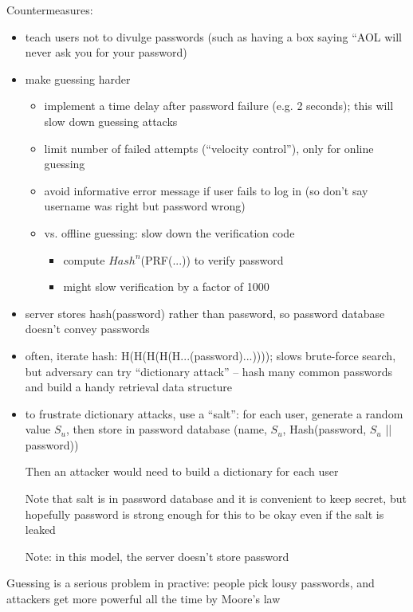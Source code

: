Countermeasures:
\begin{itemize}
    \item teach users not to divulge passwords (such as having a box saying
            ``AOL will never ask you for your password)
    \item make guessing harder
    \begin{itemize}
    	\item implement a time delay after password failure (e.g. 2 seconds); this will slow down guessing attacks
        \item limit number of failed attempts (``velocity control''), only for
                online guessing
        \item avoid informative error message if user fails to log in (so don't
                say username was right but password wrong)
        \item vs. offline guessing: slow down the verification code
        	\begin{itemize}
		\item compute $Hash^n$(PRF(...)) to verify password
		\item might slow verification by a factor of 1000
	\end{itemize}
    \end{itemize}
    \item server stores hash(password) rather than password, so password
            database doesn't convey passwords
    \item often, iterate hash: H(H(H(H(H...(password)...)))); slows brute-force
            search, but adversary can try ``dictionary attack'' -- hash many
            common passwords and build a handy retrieval data structure
    \item to frustrate dictionary attacks, use a ``salt'': for each user,
            generate a random value $S_u$, then store in password database
            (name, $S_u$, Hash(password, $S_u$ || password))

            Then an attacker would need to build a dictionary for each user

            Note that salt is in password database and it is convenient to keep
            secret, but hopefully password is strong enough for this to be okay
            even if the salt is leaked
            
            Note: in this model, the server doesn't store password
\end{itemize}
Guessing is a serious problem in practive: people pick lousy passwords, and
attackers get more powerful all the time by Moore's law

